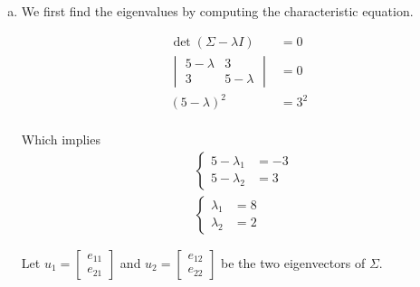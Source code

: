 \documentclass[a4paper, 10pt, twoside]{article}
\begin{document}
\begin{enumerate}[a)]
    \item We first find the eigenvalues by computing the characteristic equation.

          \begin{align*}
              \det (\Sigma - \lambda I)  & = 0   \\
              \begin{vmatrix} 5 - \lambda & 3 \\ 3 & 5 - \lambda \end{vmatrix} & = 0   \\
              (5-\lambda)^2              & = 3^2 \\
          \end{align*}

          Which implies
          \begin{align*}
               & \begin{cases}
                  5 - \lambda_1 & = -3 \\
                  5 - \lambda_2 & = 3
              \end{cases} \\
               & \begin{cases}
                  \lambda_1 & = 8 \\
                  \lambda_2 & = 2
              \end{cases}
          \end{align*}

          Let $u_1 = \begin{bmatrix}e_{11} \\ e_{21}\end{bmatrix}$ and $u_2 = \begin{bmatrix}e_{12} \\ e_{22}\end{bmatrix}$ be the two eigenvectors of $\Sigma$.


\end{enumerate}
\end{document}
